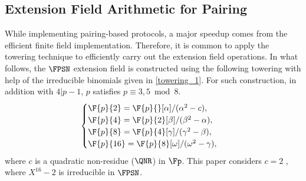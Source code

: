 \subsection{Extension Field Arithmetic for Pairing}
While implementing pairing-based protocols, a major speedup comes from the efficient finite field implementation.
Therefore, it is common to apply the towering technique to efficiently carry out the extension field operations.
In what follows, the $\FPSN$ extension field is constructed using the following towering with help of the irreducible binomials given in \eqref{towering_1}.
For such construction, in addition with $4|p-1$, $p$ satisfies $p \equiv 3, 5 \bmod 8$.  
\begin{equation}\label{towering_1}
\begin{cases}
\F{p}{2} = \F{p}{}[\alpha]/(\alpha^2-c),  \\ 
\F{p}{4} = \F{p}{2}[\beta]/(\beta^2-\alpha),  \\ 
\F{p}{8} = \F{p}{4}[\gamma]/(\gamma^2-\beta), \\ 
\F{p}{16} = \F{p}{8}[\omega]/(\omega^2-\gamma), \\ 
\end{cases}
\end{equation}
where  $c$ is a quadratic non-residue  ($\QNR$) in $\Fp$. 
This paper considers  $c = 2$ , where $X^{16}-2$ is irreducible in $\FPSN$.

